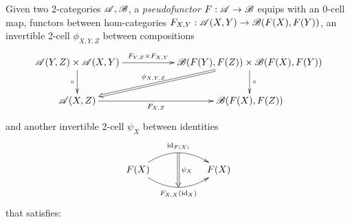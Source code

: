 \documentclass{article}
\begin{document}
\begin{defn}[Pseudofunctor]\label{defn_pseudofunctor}
    Given two 2-categories $\mathscr{A},\mathscr{B}$, a \emph{pseudofunctor} $F:\mathscr{A}\rightarrow \mathscr{B}$ equips with an 0-cell map, functors between hom-categories $F_{X,Y}:\mathscr{A}(X,Y)\rightarrow \mathscr{B}(F(X),F(Y))$, an invertible 2-cell $\phi_{X,Y,Z}$ between compositions
    \begin{align*}
        \xymatrix{
            \A(Y,Z)\times \A(X,Y) \ar[d]_-{\circ} \ar[rr]^-{F_{Y,Z}\times F_{X,Y}} && \B(F(Y),F(Z))\times\B(F(X),F(Y)) \ar[d]^-{\circ} \ar@{=>}[dll]_-{\phi_{X,Y,Z}}\\
            \A(X,Z) \ar[rr]_-{F_{X,Z}} && \B(F(X),F(Z))
        }
    \end{align*}
    and another invertible 2-cell $\psi_X$ between identities
    \begin{align*}
        \xymatrix{
            F(X) \ar@/^1.5pc/[rr]^{\id_{F(X)}}="1" \ar@/_1.5pc/[rr]_{F_{X,X}(\id_X)}="2"
            \ar@{=>} "1";"2"^{\psi_X}
            && F(X)
        }
    \end{align*}
    that satisfies:


\end{defn}
\end{document}
